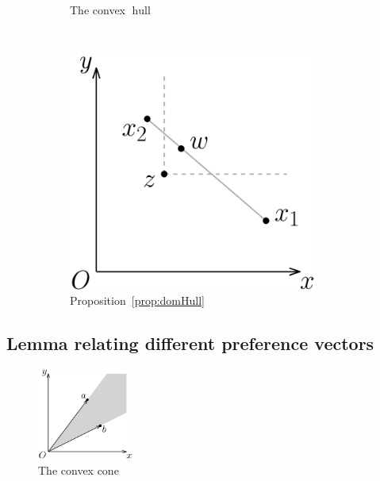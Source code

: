\documentclass[12pt]{article}
\DeclareMathOperator*{\hull}{hull}
\newcommand{\1}[1]{\mathds{1}[{#1}]}
\begin{document}
\begin{figure}[t]
\begin{subfigure}[t]{0.3\textwidth}
        \caption{The convex $\hull$}
        \label{fig:tiger}
      \end{subfigure}
      ~
      \begin{subfigure}[t]{0.3\textwidth}
        \includegraphics[width=0.9\textwidth]{figures/propDomHull}
        \caption{Proposition~\ref{prop:domHull}}
        \label{fig:domHull}
      \end{subfigure}

      \caption{}\label{fig:animals}
    \end{figure}

  \subsection{Lemma relating different preference vectors}
    \begin{figure}
      \vspace{-1.1in}
      \begin{center}
        \includegraphics[width=0.28\textwidth]{figures/defCone}
      \end{center}
      \caption{The convex cone}
      \vspace{-1in}
    \end{figure}
\end{document}
